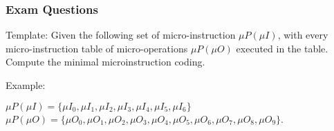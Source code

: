 
\begin{frame}
    \frametitle{Exam Questions}
    Template: Given the following set of micro-instruction $\mu P(\mu I)$, with every micro-instruction table of micro-operations $\mu P(\mu O)$ executed in the table. Compute the minimal microinstruction coding.

    Example:

    $\mu P(\mu I) = \{ \mu I_{0}, \mu I_{1}, \mu I_{2}, \mu I_{3}, \mu I_{4}, \mu I_{5}, \mu I_{6}\}$
    $\mu P(\mu O) = \{ \mu O_{0}, \mu O_{1}, \mu O_{2}, \mu O_{3}, \mu O_{4}, \mu O_{5}, \mu O_{6}, \mu O_{7}, \mu O_{8}, \mu O_{9}\}$.
    \begin{table}
    \end{table}
\end{frame}

